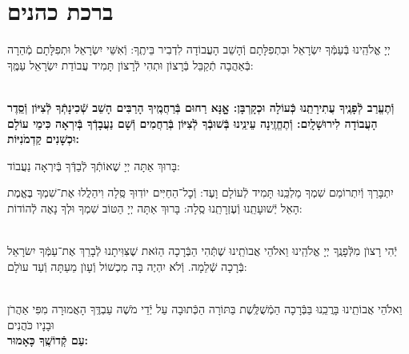\documentclass[twoside, openany, parskip=half, 11pt]{book}
\begin{document}
\\
\\


\sepline

\clearpage

\vspace{-1\baselineskip}
\section[ברכת כהנים]{ ברכת כהנים ‎}
\label{birkaskohanim}

יְיָ אֱלֹהֵֽינוּ בְּֿעַמְּֿךָ יִשְׂרָאֵל וּבִתְפִלָּתָם וְֿהָשֵׁב הָעֲבוֹדָה לִדְבִיר בֵּיתֶֽךָ: וְֿאִשֵּׁי יִשְׂרָאֵל וּתְפִלָּתָם מְֿהֵרָה בְּֿאַהֲבָה תְֿקַבֵּל בְּֿרָצוֹן וּתְהִי לְֿרָצוֹן תָּמִיד עֲבוֹדַת יִשְׂרָאֵל עַמֶּֽךָ:

\chazzanvkahal \\
\textbf{
וְֿתֶעֱרַב לְֿפָנֶֽיךָ עֲתִירָתֵֽנוּ כְּֿעוֹלָה וּכְקָרְבָּן:
אׇׇָנָּא רַחוּם בְּֿרַחֲמֶֽיךָ הָרַבִּים הָשֵׁב שְֿׁכִינָתְֿךָ לְֿצִיּוֹן וְֿסֵֽדֶר הָעֲבוֹדָה לִירוּשָׁלָֽיִם:
וְֿתֶחֱזֶֽינָה עֵינֵֽינוּ בְּֿשׁוּבְֿךָ לְֿצִיּוֹן בְּֿרַחֲמִים
וְֿשָׁם נַעֲבָדְֿךָ בְּֿיִרְאָה כִּימֵי עוֹלָם וּכְשָׁנִים קַדְמֹנִיּוֹת:
}

\chazzan
בָּרוּךְ אַתָּה יְיָ שֶׁאוֹתְֿךָ לְֿבַדְּֿךָ בְּֿיִרְאָה נַעֲבוֹד:

\modim

יִתְבָּרַךְ וְֿיִתְרוֹמַם שִׁמְךָ מַלְכֵּֽנוּ תָּמִיד לְֿעוֹלָם וָעֶד: וְֿכׇל־הַחַיִּים יוֹדֽוּךָ סֶּֽלָה וִיהַלֲלוּ אֶת־שִׁמְךָ בֶּאֱמֶת הָאֵל יְֿשׁוּעָתֵֽנוּ וְֿעֶזְרָתֵֽנוּ סֶֽלָה: בָּרוּךְ אַתָּה יְיָ הַטּוֹב שִׁמְךָ וּלְךָ נָאֶה לְֿהוֹדוֹת:

\\
יְֿהִי רָצוׂן מִלְּֿפָנֶֽךָ יְיָ אֱלֹהֵֽינוּ וֵאלֹהֵי אֲבוׂתֵֽינוּ שֶׁתְּֿהִי הַבְּֿרָכָה הַזֹּאת שֶׁצִּוִּיתָנוּ לְֿבָרֵךְ אֶת־עַמְּֿךָ יִשׂרָאֵל בְּֿרָכָה שְֿׁלֵמָה. וְֿלֹא יִהְיֶה בָּה מִכְשׁוֹל וְֿעָוׂן מֵעַתָּה וְֿעַד עוׂלָם:

\\
\shatz {}
וֵאלֹהֵי אֲבוֹתֵֽינוּ בָּרֲכֵֽנוּ בַּבְּֿרָכָה הַמְֿשֻׁלֶּֽשֶׁת בַּתּוֹרָה הַכְּֿתוּבָה עַל יְֿדֵי מֹשֶׁה עַבְדֶּֽךָ הָאֲמוּרָה מִפִּי אַהֲרֹן וּבָנָיו כֹּהֲנִים \\
\shatzvkahal
\textbf{עַם קְֿדוֹשֶֽׁךָ כָּאָמוּר:}
\end{document}
